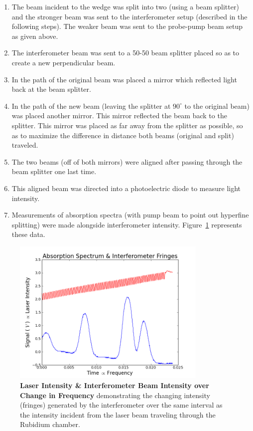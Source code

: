 \documentclass[paper=a4, fontsize=11pt]{scrartcl} %
\numberwithin{equation}{section}
\numberwithin{figure}{section}
\numberwithin{table}{section}
\begin{document}
\begin{enumerate}
\item The beam incident to the wedge was split into two (using a beam splitter) and the stronger beam was sent to the interferometer setup (described in the following steps). The weaker beam was sent to the probe-pump beam setup as given above.
\item The interferometer beam was sent to a 50-50 beam splitter placed so as to create a new perpendicular beam.
\item In the path of the original beam was placed a mirror which reflected light back at the beam splitter.
\item In the path of the new beam (leaving the splitter at $90^\circ$ to the original beam) was placed another mirror. This mirror reflected the beam back to the splitter. This mirror was placed as far away from the splitter as possible, so as to maximize the difference in distance both beams (original and split) traveled.
\item The two beams (off of both mirrors) were aligned after passing through the beam splitter one last time.
\item This aligned beam was directed into a photoelectric diode to measure light intensity.
\item Measurements of absorption spectra (with pump beam to point out hyperfine splitting) were made alongside interferometer intensity. Figure~\ref{fig:int_1} represents these data.
\end{enumerate}


\begin{figure}[H] \begin{center}
  \includegraphics[height=70mm]{4-1-009.png}
  \caption{\textbf{Laser Intensity \& Interferometer Beam Intensity over Change in Frequency} demonstrating the changing intensity (fringes) generated by the interferometer over the same interval as the intensity incident from the laser beam traveling through the Rubidium chamber. }
  \label{fig:int_1}
\end{center} \end{figure}
\end{document}
